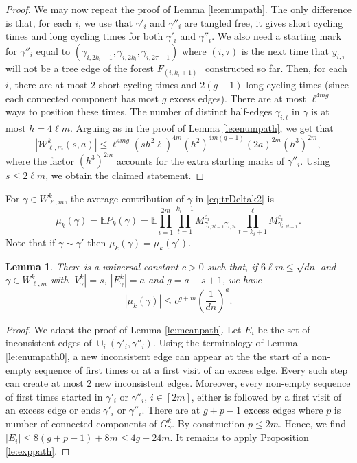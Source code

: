 \documentclass[11pt]{article}
\newtheorem{lemma}{Lemma}
\newcommand{\dE}{\mathbb {E}}
\newcommand{\cE}{E}
\newcommand{\cW}{\mathcal {W}}
\newcommand{\ABS}[1]{{{\left| #1 \right|}}} %
\newcommand{\PAR}[1]{{{\left(#1\right)}}} %
\newcommand{\1}{1\!\!{\sf I}}\newcommand{\IND}{\1}
\newcommand{\veps}{\varepsilon}
\begin{document}
\begin{proof}
   

We may now repeat the proof of Lemma \ref{le:enumpath}. The only difference is that, for each $i$, we use that $\gamma'_i$ and $\gamma''_i$ are tangled free, it gives short cycling times and long cycling times for both $\gamma'_i$ and $\gamma''_i$.  We also need a starting mark for $\gamma''_i$ equal to $(\gamma_{i,2k_i-1},\gamma_{i,2k_i}, \gamma_{i,2\tau-1})$ where  $(i,\tau)$ is the next time that $y_{i,\tau}$ will not be a tree edge of the forest $F_{(i,k_i+1)_-}$ constructed so far. Then, for each $i$, there are at most $2$ short cycling times and $2 (g-1)$ long cycling times (since each connected component has most $g$ excess edges). There are at most $ \ell  ^{4m g}$ ways to position these times. The number of distinct half-edges $\gamma_{i,t}$ in $\gamma$ is at most $h = 4 \ell m$. Arguing as in the proof of Lemma \ref{le:enumpath}, we get that    
$$
| \cW^k_{\ell,m} (s,a) | \leq \ell^{4 m g} ( s h^2 \ell )^{4m}    ( h^2 ) ^{4m (g-1)} (2a) ^{2m} ( h^3  )^{2m} , 
$$
where the factor $(h^3 )^{2m}$ accounts for the extra  starting marks of $\gamma''_i$.  Using $s \leq 2\ell m$, we obtain the claimed statement. \end{proof}


For $\gamma \in W^k_{\ell,m}$, the average contribution of $\gamma$ in \eqref{eq:trDeltak2} is
\begin{equation*}\label{eq:defmug0}
\mu_k(\gamma) =  \dE P_k (\gamma) =  \dE \prod_{i=1}^{2m}  \prod_{t=1}^{k_i-1}  M^{\veps_i}_{\gamma_{i,2t-1}  \gamma_{i,2t}}   \prod_{t=k_i+1}^{\ell} M^{\veps_i}_{\gamma_{i,2t-1}}.
\end{equation*}
Note that if $\gamma \sim \gamma'$ then $\mu_k (\gamma) = \mu_k (\gamma')$. 
\begin{lemma}\label{le:meanpath0}
There is a universal constant $c > 0$ such that, if $6 \ell m \leq \sqrt{ d n}$ and $\gamma \in W^k_{\ell,m} $ with $|V^k_\gamma| = s$, $|\cE^k_\gamma |= a$ and $g = a - s +1$, we have
$$
\ABS{ \mu_k(\gamma)} \leq  c^{g+m}  \PAR{\frac{ 1 }{dn} }^a.  %
$$
\end{lemma}
\begin{proof} 
We adapt the proof of Lemma \ref{le:meanpath}. Let $\cE_i $ be the set of inconsistent edges of $\cup_i (\gamma'_i, \gamma''_i)$. Using the terminology of Lemma \ref{le:enumpath0}, a new inconsistent edge can appear at the the start of a non-empty sequence of first times or at a first visit of an excess edge. Every such step can create at most $2$ new inconsistent edges. Moreover, every non-empty sequence of
first times started in $\gamma'_i$ or $\gamma''_i$, $i \in [2m]$, either is followed by a first visit of an excess edge or ends $\gamma'_i$ or $\gamma''_i$. There are at $g +p -1 $ excess edges where $p$ is number of connected components of $G^k_\gamma$. By construction $p \leq 2m$. Hence, we find $|E_i| \leq 8 (g +p -1)+ 8m \leq 4 g +24m $. It remains to apply  Proposition \ref{le:exppath}. 
\end{proof}
\end{document}
